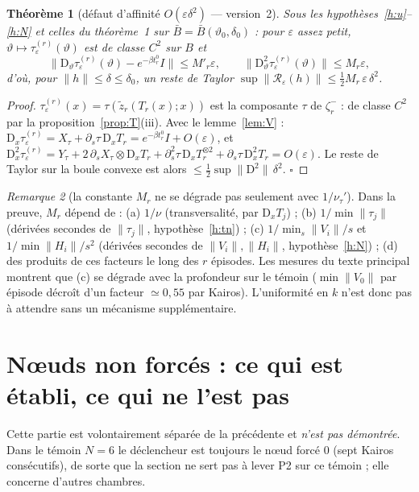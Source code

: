 \documentclass[11pt,a4paper]{article}
\newtheorem{theoreme}{Théorème}
\theoremstyle{remark}
\newtheorem{remarque}[theoreme]{Remarque}
\theoremstyle{definition}
\newcommand{\norm}[1]{\lVert #1\rVert}
\newcommand{\eps}{\varepsilon}
\newcommand{\vth}{\vartheta}
\newcommand{\zt}{\widetilde z}
\newcommand{\D}{\mathrm D}
\begin{document}
\begin{theoreme}[défaut d'affinité $O(\eps\delta^2)$ --- version~2]\label{thm:aff}
Sous les hypothèses~\ref{h:u}--\ref{h:N} et celles du théorème~1 sur $\bar B=\bar B(\vth_0,\delta_0)$ : pour $\eps$ assez petit, $\vth\mapsto\tau^{(r)}_\eps(\vth)$ est de classe $C^2$ sur $B$ et
\[
\norm{\D_\vth\tau^{(r)}_\eps(\vth)-e^{-\beta t_r^0}I}\le M'_r\eps,\qquad \norm{\D^2_\vth\tau^{(r)}_\eps(\vth)}\le M_r\eps,
\]
d'où, pour $\norm h\le\delta\le\delta_0$, un reste de Taylor $\sup\norm{\mathcal R_\eps(h)}\le\tfrac12M_r\,\eps\,\delta^2$.
\end{theoreme}
\begin{proof}
$\tau^{(r)}_\eps(x)=\tau(\zt_r(T_r(x);x))$ est la composante $\tau$ de $\zeta^-_r$ : de classe $C^2$ par la proposition~\ref{prop:T}(iii). Avec le lemme~\ref{lem:V} : $\D_x\tau^{(r)}_\eps=X_\tau+\partial_s\tau\,\D_xT_r=e^{-\beta t_r^0}I+O(\eps)$, et $\D_x^2\tau^{(r)}_\eps=Y_\tau+2\,\partial_s X_\tau\otimes\D_xT_r+\partial_s^2\tau\,\D_xT_r^{\otimes2}+\partial_s\tau\,\D_x^2T_r=O(\eps)$. Le reste de Taylor sur la boule convexe est alors $\le\frac12\sup\norm{\D^2}\,\delta^2$. $\square$
\end{proof}

\begin{remarque}[la constante $M_r$ ne se dégrade pas seulement avec $1/\nu_\tau'$]
Dans la preuve, $M_r$ dépend de : (a) $1/\nu$ (transversalité, par $\D_xT_j$) ; (b) $1/\min\norm{\tau_j}$ (dérivées secondes de $\norm{\tau_j}$, hypothèse~\ref{h:tn}) ; (c) $1/\min_s\norm{V_i}/s$ et $1/\min\norm{H_i}/s^2$ (dérivées secondes de $\norm{V_i},\norm{H_i}$, hypothèse~\ref{h:N}) ; (d) des produits de ces facteurs le long des $r$ épisodes. Les mesures du texte principal montrent que (c) se dégrade avec la profondeur sur le témoin ($\min\norm{V_0}$ par épisode décroît d'un facteur $\simeq0{,}55$ par Kairos). L'uniformité en $k$ n'est donc pas à attendre sans un mécanisme supplémentaire.
\end{remarque}

\section{N\oe uds non forcés : ce qui est établi, ce qui ne l'est pas}\label{sec:nonforce}

Cette partie est volontairement séparée de la précédente et \emph{n'est pas démontrée}. Dans le témoin $N=6$ le déclencheur est toujours le n\oe ud forcé $0$ (sept Kairos consécutifs), de sorte que la section ne sert pas à lever P2 sur ce témoin ; elle concerne d'autres chambres.
\end{document}
